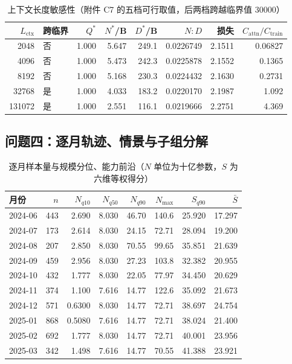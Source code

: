 \begin{table}[htbp]
  \centering
  \caption{上下文长度敏感性（附件 C7 的五档可行取值，后两档跨越临界值 30000）}
  \label{tab:app-q3-lctx}
  \small
  \begin{tabular}{@{}rlrrrrrr@{}}
    \toprule
    $L_{\text{ctx}}$ & 跨临界 & $Q^{*}$ & $N^{*}$/B & $D^{*}$/B & $N{:}D$ & 损失 & $C_{\text{attn}}/C_{\text{train}}$ \\
    \midrule
    2048 & 否 & 1.000 & 5.647 & 249.1 & 0.0226749 & 2.1511 & 0.06827 \\
    4096 & 否 & 1.000 & 5.473 & 242.3 & 0.0225878 & 2.1552 & 0.1365 \\
    8192 & 否 & 1.000 & 5.168 & 230.3 & 0.0224432 & 2.1630 & 0.2731 \\
    32768 & 是 & 1.000 & 4.033 & 183.2 & 0.0220170 & 2.1987 & 1.092 \\
    131072 & 是 & 1.000 & 2.551 & 116.1 & 0.0219666 & 2.2751 & 4.369 \\
    \bottomrule
  \end{tabular}
\end{table}

\clearpage
\subsection{问题四：逐月轨迹、情景与子组分解}

\begin{table}[htbp]
  \centering
  \caption{逐月样本量与规模分位、能力前沿（$N$ 单位为十亿参数，$S$ 为六维等权得分）}
  \label{tab:app-q4-monthly}
  \small
  \begin{tabular}{@{}lrrrrrrr@{}}
    \toprule
    月份 & $n$ & $N_{q10}$ & $N_{q50}$ & $N_{q90}$ & $N_{\max}$ & $S_{q90}$ & $\bar{S}$ \\
    \midrule
    2024-06 & 443 & 2.690 & 8.030 & 46.70 & 140.6 & 25.920 & 17.297 \\
    2024-07 & 173 & 2.614 & 8.030 & 24.15 & 72.71 & 28.094 & 19.200 \\
    2024-08 & 207 & 2.850 & 8.030 & 70.55 & 99.65 & 35.851 & 21.639 \\
    2024-09 & 459 & 2.956 & 8.030 & 27.23 & 103.8 & 32.382 & 20.955 \\
    2024-10 & 432 & 1.777 & 8.030 & 22.05 & 77.97 & 34.450 & 20.629 \\
    2024-11 & 374 & 1.100 & 7.616 & 14.77 & 122.6 & 35.092 & 21.673 \\
    2024-12 & 571 & 0.6300 & 8.030 & 14.77 & 72.71 & 38.697 & 24.754 \\
    2025-01 & 868 & 0.5080 & 7.616 & 14.77 & 72.71 & 38.024 & 21.400 \\
    2025-02 & 692 & 1.777 & 8.030 & 14.77 & 72.71 & 40.001 & 23.956 \\
    2025-03 & 342 & 1.498 & 7.616 & 14.77 & 70.55 & 41.388 & 23.921 \\
    \bottomrule
  \end{tabular}
\end{table}

